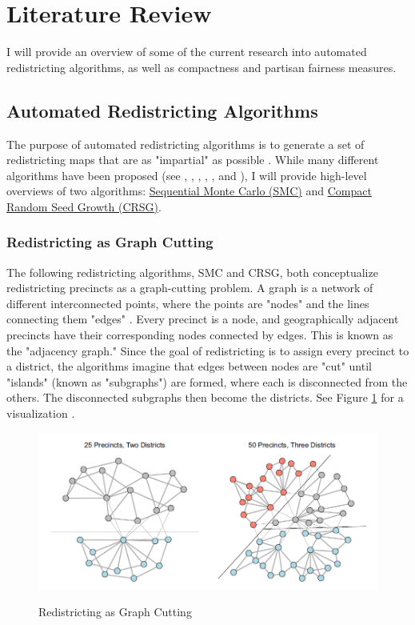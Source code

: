 \section{Literature Review}
\label{sec:litreview}

I will provide an overview of some of the current research into automated redistricting algorithms, as well as compactness and partisan fairness measures. 

\subsection{Automated Redistricting Algorithms}

The purpose of automated redistricting algorithms is to generate a set of redistricting maps that are as "impartial" as possible \parencite{chen2013}. While many different algorithms have been proposed (see \textcite{altman2011}, \textcite{haas2020}, \textcite{lara-caballero2019}, \textcite{macmillan2001}, \textcite{weaver1963}, and \textcite{xiao2008}), I will provide high-level overviews of two algorithms: \hyperref[sec:smc]{Sequential Monte Carlo (SMC)} and \hyperref[sec:crsg]{Compact Random Seed Growth (CRSG)}. 

\subsubsection{Redistricting as Graph Cutting}
\label{sec:redistasgraphcut}


The following redistricting algorithms, SMC and CRSG, both conceptualize redistricting precincts as a graph-cutting problem. A graph is a network of different interconnected points, where the points are "nodes" and the lines connecting them "edges" \parencite{fifield2020}. Every precinct is a node, and geographically adjacent precincts have their corresponding nodes connected by edges. This is known as the "adjacency graph." Since the goal of redistricting is to assign every precinct to a district, the algorithms imagine that edges between nodes are "cut" until "islands" (known as "subgraphs") are formed, where each is disconnected from the others. The disconnected subgraphs then become the districts. See Figure \ref{fig:graphcut} for a visualization \parencite{fifield2020}. 

\begin{figure}[t]
    \caption{Redistricting as Graph Cutting}
    \includegraphics[width=0.7\linewidth]{img/graphcut.png}
    \label{fig:graphcut}
    \raggedright
\end{figure} 

